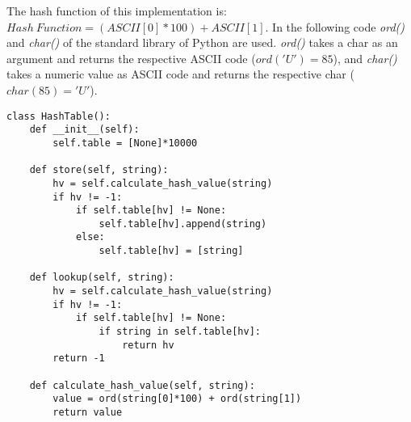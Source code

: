 The hash function of this implementation is: \(Hash \ Function = (ASCII[0]*100) + ASCII[1]\). In the following code \textit{ord()} and \textit{char()} of the standard library of Python are used. \textit{ord()} takes a char as an argument and returns the respective ASCII code (\(ord('U')=85\)), and \textit{char()} takes a numeric value as ASCII code and returns the respective char (\(char(85)='U'\)).
\begin{lstlisting}[firstnumber=1, caption={String key implementation.}]
class HashTable():
	def __init__(self):
		self.table = [None]*10000
	
	def store(self, string):
		hv = self.calculate_hash_value(string)
		if hv != -1:
			if self.table[hv] != None:
				self.table[hv].append(string)
			else:
				self.table[hv] = [string]
	
	def lookup(self, string):
		hv = self.calculate_hash_value(string)
		if hv != -1:
			if self.table[hv] != None:
				if string in self.table[hv]:
					return hv
		return -1
	
	def calculate_hash_value(self, string):
		value = ord(string[0]*100) + ord(string[1])
		return value
\end{lstlisting}